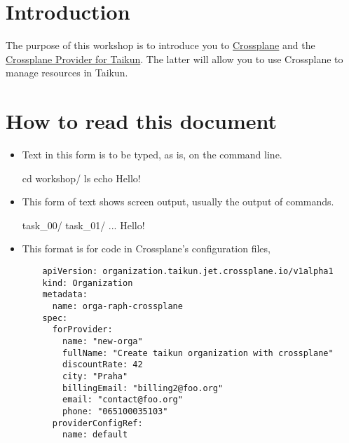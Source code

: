 \section{Introduction}
The purpose of this workshop is to introduce you to
\href{https://www.terraform.io/intro/index.html}{Crossplane}
and the \href{https://registry.terraform.io/providers/itera-io/taikun/latest}{Crossplane Provider for Taikun}.
The latter will allow you to use Crossplane to manage resources in Taikun.

\section{How to read this document}

\begin{itemize}
  \item Text in this form is to be typed, as is, on the command line.
\begin{shell}
cd workshop/
ls
echo Hello!
\end{shell}
\item This form of text shows screen output, usually the output of commands.
\begin{raw}
task_00/
task_01/
...
Hello!
\end{raw}
\item This format is for code in Crossplane's configuration files,
\begin{verbatim}
    apiVersion: organization.taikun.jet.crossplane.io/v1alpha1
    kind: Organization
    metadata:
      name: orga-raph-crossplane
    spec:
      forProvider:
        name: "new-orga"
        fullName: "Create taikun organization with crossplane"
        discountRate: 42
        city: "Praha"
        billingEmail: "billing2@foo.org"
        email: "contact@foo.org"
        phone: "065100035103"
      providerConfigRef:
        name: default
\end{verbatim}
\end{itemize}
